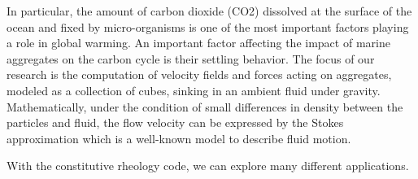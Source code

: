  In particular, the amount of carbon dioxide (CO2) dissolved at the surface of the ocean and fixed by micro-organisms is one of the most important factors playing a role in global warming. An important factor affecting the impact of marine aggregates on the carbon cycle is their settling behavior. The focus of our research is the computation of velocity fields and forces acting on aggregates, modeled as a collection of cubes, sinking in an ambient fluid under gravity. Mathematically, under the condition of small differences in density between the particles and fluid, the flow velocity can be expressed by the Stokes approximation which is a well-known model to describe fluid motion.

 With the constitutive rheology code, we can explore many different applications. 